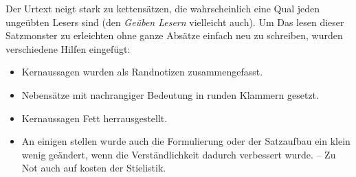 \medskip

Der Urtext neigt stark zu kettensätzen, die wahrscheinlich eine Qual jeden
ungeübten Lesers sind (den \textit{Geüben Lesern} vielleicht auch). Um
Das lesen dieser Satzmonster zu erleichten ohne ganze Absätze einfach neu
zu schreiben, wurden verschiedene Hilfen eingefügt:

\begin{itemize}
 \item Kernaussagen wurden als Randnotizen zusammengefasst.
 \item Nebensätze mit nachrangiger Bedeutung in runden Klammern gesetzt.
 \item Kernaussagen Fett herrausgestellt.
 \item An einigen stellen wurde auch die Formulierung oder der Satzaufbau
 ein klein wenig geändert, wenn die Verständlichkeit dadurch verbessert wurde.
 -- Zu Not auch auf kosten der Stielistik.
\end{itemize}

